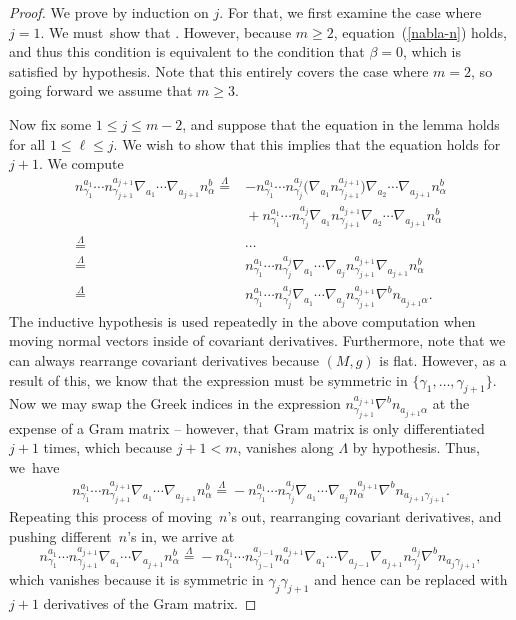 \documentclass[pdftex]{sigma}
\numberwithin{equation}{section}
\renewcommand{\=}{\stackrel \Lambda =}
\begin{document}
\begin{proof}
We prove by induction on $j$. For that, we first examine the case where $j = 1$. We must~show that \smash{$n^a_{\gamma} \nabla_a n^b_{\alpha} \= 0$}. However, because $m \geq 2$, equation~(\ref{nabla-n}) holds, and thus this condition is equivalent to the condition that $\beta = 0$, which is satisfied by hypothesis. Note that this entirely covers the case where $m = 2$, so going forward we assume that $m \geq 3$.

Now fix some $1 \leq j \leq m-2$, and suppose that the equation in the lemma holds for all $1 \leq \ell \leq j$. We wish to show that this implies that the equation holds for $j+1$. We compute
\begin{align*}
n^{a_1}_{\gamma_1} \cdots n^{a_{j+1}}_{\gamma_{j+1}} \nabla_{a_1} \cdots \nabla_{a_{j+1}} n^b_\alpha \=&-n^{a_1}_{\gamma_1} \cdots n^{a_{j}}_{\gamma_{j}} \bigl(\nabla_{a_1} n^{a_{j+1}}_{\gamma_{j+1}}\bigr) \nabla_{a_2} \cdots \nabla_{a_{j+1}} n^b_{\alpha} \\&{}+ n^{a_1}_{\gamma_1} \cdots n^{a_{j}}_{\gamma_{j}} \nabla_{a_1} n^{a_{j+1}}_{\gamma_{j+1}} \nabla_{a_2} \cdots \nabla_{a_{j+1}} n^b_\alpha \\
\={}& \cdots \\
\={}& n^{a_1}_{\gamma_1} \cdots n^{a_{j}}_{\gamma_{j}} \nabla_{a_1} \cdots \nabla_{a_j} n^{a_{j+1}}_{\gamma_{j+1}} \nabla_{a_{j+1}} n^b_{\alpha} \\
\={}& n^{a_1}_{\gamma_1} \cdots n^{a_{j}}_{\gamma_{j}} \nabla_{a_1} \cdots \nabla_{a_j} n^{a_{j+1}}_{\gamma_{j+1}} \nabla^b n_{a_{j+1} \alpha} .
\end{align*}
The inductive hypothesis is used repeatedly in the above computation when moving normal vectors inside of covariant derivatives. Furthermore, note that we can always rearrange covariant derivatives because $(M,g)$ is flat. However, as a result of this, we know that the expression must be symmetric in $\big\{\gamma_1, \ldots, \gamma_{j+1}\big\}$. Now we may swap the Greek indices in the expression $n^{a_{j+1}}_{\gamma_{j+1}} \nabla^b n_{a_{j+1} \alpha}$ at the expense of a Gram matrix -- however, that Gram matrix is only differentiated $j+1$ times, which because $j+1 < m$, vanishes along $\Lambda$ by hypothesis. Thus, we~have
\begin{align*}
n^{a_1}_{\gamma_1} \cdots n^{a_{j+1}}_{\gamma_{j+1}} \nabla_{a_1} \cdots \nabla_{a_{j+1}} n^b_\alpha \= -n^{a_1}_{\gamma_1} \cdots n^{a_{j}}_{\gamma_{j}} \nabla_{a_1} \cdots \nabla_{a_j} n^{a_{j+1}}_{\alpha} \nabla^b n_{a_{j+1} \gamma_{j+1}} .
\end{align*}
Repeating this process of moving~$n$'s out, rearranging covariant derivatives, and pushing different~$n$'s in, we arrive at
\[
n^{a_1}_{\gamma_1} \cdots n^{a_{j+1}}_{\gamma_{j+1}} \nabla_{a_1} \cdots \nabla_{a_{j+1}} n^b_\alpha \= -n^{a_1}_{\gamma_1} \cdots n^{a_{j-1}}_{\gamma_{j-1}} n^{a_{j+1}}_{\alpha} \nabla_{a_1} \cdots \nabla_{a_{j-1}} \nabla_{a_{j+1}} n^{a_{j}}_{\gamma_{j}} \nabla^b n_{a_{j} \gamma_{j+1}} ,
\]
which vanishes because it is symmetric in $\gamma_j \gamma_{j+1}$ and hence can be replaced with $j+1$ derivatives of the Gram matrix.
\end{proof}
\end{document}
